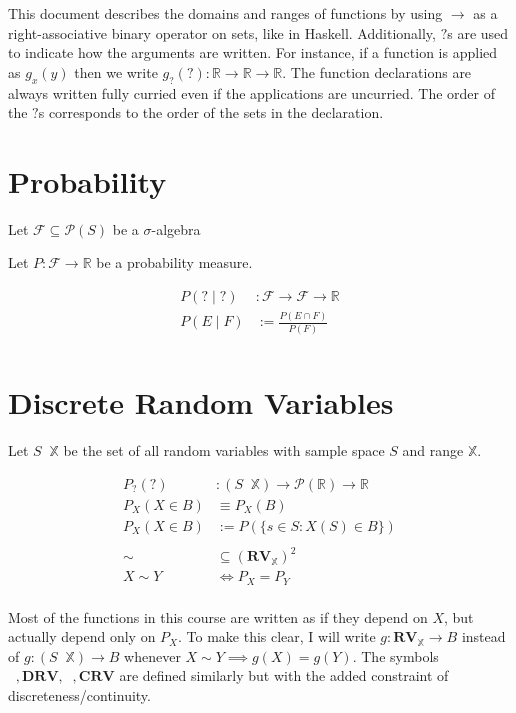 \documentclass[12pt]{article}
\theoremstyle{definition}
\newcommand{\R}{\mathbb{R}}
\newcommand{\F}{\mathcal{F}}
\newcommand{\X}{\mathbb{X}}
\newcommand{\RV}{\mathbf{RV}}
\newcommand{\DRV}{\mathbf{DRV}}
\newcommand{\CRV}{\mathbf{CRV}}
\renewcommand{\P}{{\mathcal{P}}}
\DeclareMathOperator{\rvto}{\xrightarrow{RV}}
\DeclareMathOperator{\drvto}{\xrightarrow{DRV}}
\DeclareMathOperator{\crvto}{\xrightarrow{CRV}}
\begin{document}
\noindent This document describes the domains and ranges of functions by using $\to$ as a right-associative binary operator on sets, like in Haskell.
Additionally, $?$s are used to indicate how the arguments are written.
For instance, if a function is applied as $g_x(y)$ then we write $g_{?}(?) : \R \to \R \to \R$.
The function declarations are always written fully curried even if the applications are uncurried.
The order of the $?$s corresponds to the order of the sets in the declaration.

\setcounter{section}{2}

\section{Probability}

\noindent Let $\F \subseteq \P(S)$ be a $\sigma$-algebra

\noindent Let $P : \F \to \R$ be a probability measure.

\begin{align*}
  P(? \mid ?) &: \F \to \F \to \R\\
  P(E \mid F) &:= \frac{P(E \cap F)}{P(F)}\\
\end{align*}

\section{Discrete Random Variables}

\noindent Let $S \rvto \X$ be the set of all random variables with sample space $S$ and range $\X$.

\begin{align*}
  P_{?}(?) &: (S \rvto \X) \to \P(\R) \to \R\\
  P_X(X \in B) &\equiv P_X(B)\\
  P_X(X \in B) &:= P(\{s \in S : X(S) \in B\})\\
  \\
  \sim &\subseteq (\RV_\X)^2\\
  X \sim Y &\iff P_X = P_Y\\
\end{align*}

\noindent Most of the functions in this course are written as if they depend on $X$, but actually depend only on $P_X$.
To make this clear, I will write $g : \RV_\X \to B$ instead of $g : (S \rvto \X) \to B$ whenever $X \sim Y \implies g(X) = g(Y)$.
The symbols $\drvto, \DRV, \crvto, \CRV$ are defined similarly but with the added constraint of discreteness/continuity. 
\end{document}
